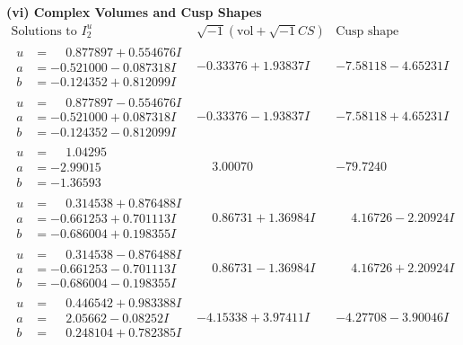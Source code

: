 \documentclass[1p]{elsarticle_modified}
\theoremstyle{definition}
\newcommand{\I}{\sqrt{-1}}
\begin{document}
\newpage\flushleft \textbf{(vi) Complex Volumes and Cusp Shapes}
$$\begin{array}{c|c|c}  
\text{Solutions to }I^u_{2}& \I (\text{vol} + \sqrt{-1}CS) & \text{Cusp shape}\\
 \hline 
\begin{aligned}
u &= \phantom{-}0.877897 + 0.554676 I \\
a &= -0.521000 - 0.087318 I \\
b &= -0.124352 + 0.812099 I\end{aligned}
 & -0.33376 + 1.93837 I & -7.58118 - 4.65231 I \\ \hline\begin{aligned}
u &= \phantom{-}0.877897 - 0.554676 I \\
a &= -0.521000 + 0.087318 I \\
b &= -0.124352 - 0.812099 I\end{aligned}
 & -0.33376 - 1.93837 I & -7.58118 + 4.65231 I \\ \hline\begin{aligned}
u &= \phantom{-}1.04295\phantom{ +0.000000I} \\
a &= -2.99015\phantom{ +0.000000I} \\
b &= -1.36593\phantom{ +0.000000I}\end{aligned}
 & \phantom{-}3.00070\phantom{ +0.000000I} & -79.7240\phantom{ +0.000000I} \\ \hline\begin{aligned}
u &= \phantom{-}0.314538 + 0.876488 I \\
a &= -0.661253 + 0.701113 I \\
b &= -0.686004 + 0.198355 I\end{aligned}
 & \phantom{-}0.86731 + 1.36984 I & \phantom{-}4.16726 - 2.20924 I \\ \hline\begin{aligned}
u &= \phantom{-}0.314538 - 0.876488 I \\
a &= -0.661253 - 0.701113 I \\
b &= -0.686004 - 0.198355 I\end{aligned}
 & \phantom{-}0.86731 - 1.36984 I & \phantom{-}4.16726 + 2.20924 I \\ \hline\begin{aligned}
u &= \phantom{-}0.446542 + 0.983388 I \\
a &= \phantom{-}2.05662 - 0.08252 I \\
b &= \phantom{-}0.248104 + 0.782385 I\end{aligned}
 & -4.15338 + 3.97411 I & -4.27708 - 3.90046 I \\ \hline\begin{aligned}

\end{aligned}
\end{array}$$
\end{document}
